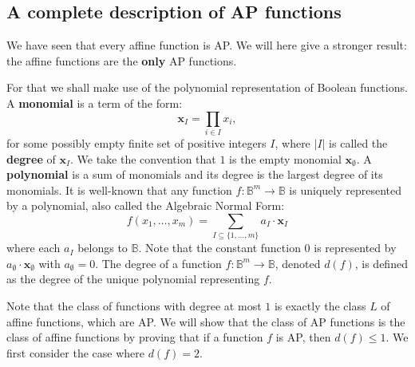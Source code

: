 \subsection{A complete description of AP functions}

We have seen that every affine function is AP. We will here give a stronger
result: the affine functions are the \textbf{only} AP functions.

For that we shall make use of the  polynomial representation of Boolean functions.
A \textbf{ monomial} is a term of the form:
$$
\mathbf{x}_I=\underset{i\in I}{\prod}x_i, $$ for some possibly empty finite set of
positive integers $I$, where $|I|$ is called the \textbf{degree} of
$\mathbf{x}_I$.   We take the convention that $1$ is the empty monomial
$\mathbf{x}_\emptyset $. A \textbf{ polynomial} is a sum of monomials and its
degree is the largest degree of its monomials.  It is well-known
\cite{StoneAlgebra36,ZhegalkinAlgebra27} that any function
$f:\mathbb{B}^m\rightarrow \mathbb{B}$ is uniquely represented by a polynomial,
also called the Algebraic Normal Form: $$f(x_1,\ldots,x_m)=\sum_{I\subseteq
\{1,\ldots,m\}}a_I\cdot \mathbf{x}_I$$ where each $a_I$ belongs to
$\mathbb{B}$. Note that the constant function $0$ is represented by
$a_\emptyset\cdot \mathbf{x}_\emptyset$ with $a_\emptyset =0$. The degree of a
function $f:\mathbb{B}^m\rightarrow \mathbb{B}$, denoted $d(f)$, is defined as
the degree of the unique polynomial representing $f$.

Note that the class of functions with degree at most $1$ is exactly the class
$L$ of affine functions, which are AP. We will show that the class of AP
functions is the class of affine functions by proving that if a function $f$ is
AP, then $d(f)\leq 1$. We first consider the case where $d(f) = 2$.


